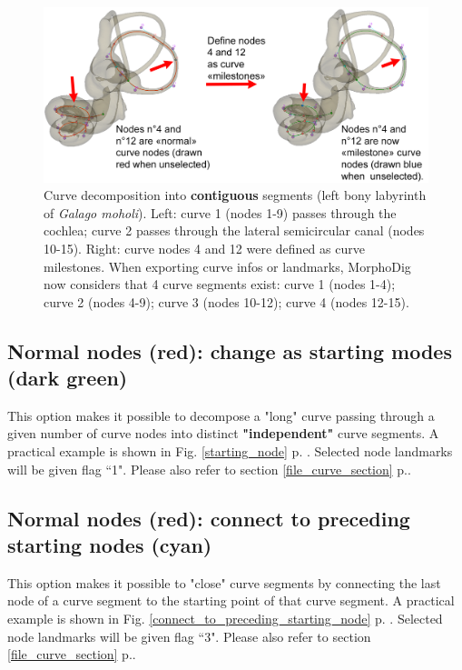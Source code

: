 \begin{figure}
  \centering
  \includegraphics[scale=0.23]{images/10/curve_milestones.png} 
	\caption{Curve decomposition into \textbf{contiguous} segments (left bony labyrinth of \textit{Galago moholi}). Left: curve 1 (nodes 1-9) passes through the cochlea; curve 2 passes through the lateral semicircular canal (nodes 10-15). Right: curve nodes 4 and 12 were defined as curve milestones. When exporting curve infos or landmarks, MorphoDig now considers that 4 curve segments exist: curve 1 (nodes 1-4); curve 2 (nodes 4-9); curve 3 (nodes 10-12); curve 4 (nodes 12-15).}
\label{curve_milestone}
\end{figure}

\subsection{Normal nodes (red): change as starting modes (dark green)}\label{section_curve_segment1}
This option makes it possible to decompose a "long" curve passing through a given number of curve nodes into distinct \textbf{"independent"} curve segments. A practical example is shown in Fig. \ref{starting_node} p. \pageref{starting_node}. Selected node landmarks will be given flag ``1". Please also refer to section \ref{file_curve_section} p.\pageref{file_curve_section}.


\subsection{Normal nodes (red): connect to preceding starting nodes (cyan)}
This option makes it possible to "close" curve segments by connecting the last node of a curve segment to the starting point of that curve segment. A practical example is shown in Fig. \ref{connect_to_preceding_starting_node} p. \pageref{connect_to_preceding_starting_node}. Selected node landmarks will be given flag ``3". Please also refer to section \ref{file_curve_section} p.\pageref{file_curve_section}.



